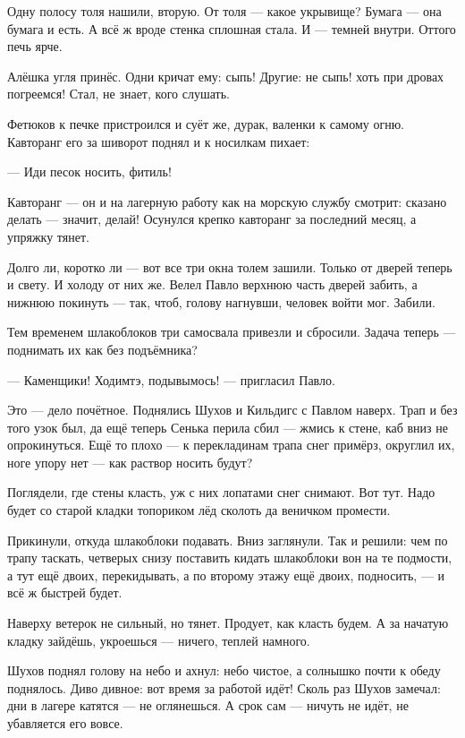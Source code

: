 Одну полосу толя нашили, вторую. От толя --- какое укрывище? Бумага --- она бумага и есть. А всё ж 
вроде стенка сплошная стала. И --- темней внутри. Оттого печь ярче.

Алёшка угля принёс. Одни кричат ему: сыпь! Другие: не сыпь! хоть при дровах погреемся! Стал, не 
знает, кого слушать.

Фетюков к печке пристроился и суёт же, дурак, валенки к самому огню. Кавторанг его за шиворот 
поднял и к носилкам пихает:

--- Иди песок носить, фитиль!

Кавторанг --- он и на лагерную работу как на морскую службу смотрит: сказано делать --- значит, 
делай! Осунулся крепко кавторанг за последний месяц, а упряжку тянет.

Долго ли, коротко ли --- вот все три окна толем зашили. Только от дверей теперь и свету. И 
холоду от них же. Велел Павло верхнюю часть дверей забить, а нижнюю покинуть --- так, чтоб, 
голову нагнувши, человек войти мог. Забили.

Тем временем шлакоблоков три самосвала привезли и сбросили. Задача теперь --- поднимать их 
как без подъёмника?

--- Каменщики! Ходимтэ, подывымось! --- пригласил Павло.

Это --- дело почётное. Поднялись Шухов и Кильдигс с Павлом наверх. Трап и без того узок был, да 
ещё теперь Сенька перила сбил --- жмись к стене, каб вниз не опрокинуться. Ещё то плохо --- к 
перекладинам трапа снег примёрз, округлил их, ноге упору нет --- как раствор носить будут?

Поглядели, где стены класть, уж с них лопатами снег снимают. Вот тут. Надо будет со старой 
кладки топориком лёд сколоть да веничком промести.

Прикинули, откуда шлакоблоки подавать. Вниз заглянули. Так и решили: чем по трапу таскать, 
четверых снизу поставить кидать шлакоблоки вон на те подмости, а тут ещё двоих, 
перекидывать, а по второму этажу ещё двоих, подносить, --- и всё ж быстрей будет.

Наверху ветерок не сильный, но тянет. Продует, как класть будем. А за начатую кладку зайдёшь, 
укроешься --- ничего, теплей намного.

Шухов поднял голову на небо и ахнул: небо чистое, а солнышко почти к обеду поднялось. Диво 
дивное: вот время за работой идёт! Сколь раз Шухов замечал: дни в лагере катятся --- не 
оглянешься. А срок сам --- ничуть не идёт, не убавляется его вовсе.

